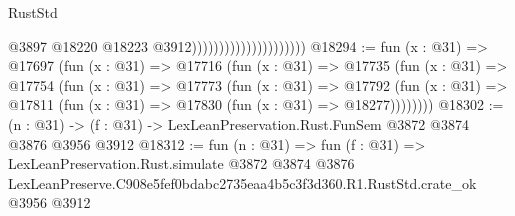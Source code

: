 \begin{lexlean}{RustStd}
\begin{coremodule}
                                              @3897
                                              @18220
                                              @18223
                                              @3912)))))))))))))))))))))
@18294 := fun (x : @31) =>
  @17697
    (fun (x : @31) =>
    @17716
      (fun (x : @31) =>
      @17735
        (fun (x : @31) =>
        @17754
          (fun (x : @31) =>
          @17773
            (fun (x : @31) =>
            @17792
              (fun (x : @31) => @17811 (fun (x : @31) => @17830 (fun (x : @31) => @18277))))))))
@18302 := (n : @31) -> (f : @31) -> LexLeanPreservation.Rust.FunSem @3872 @3874 @3876 @3956 @3912
@18312 := fun (n : @31) =>
  fun (f : @31) =>
  LexLeanPreservation.Rust.simulate
    @3872
    @3874
    @3876
    LexLeanPreserve.C908e5fef0bdabc2735eaa4b5c3f3d360.R1.RustStd.crate_ok
    @3956
    @3912
\end{coremodule}
\end{lexlean}
